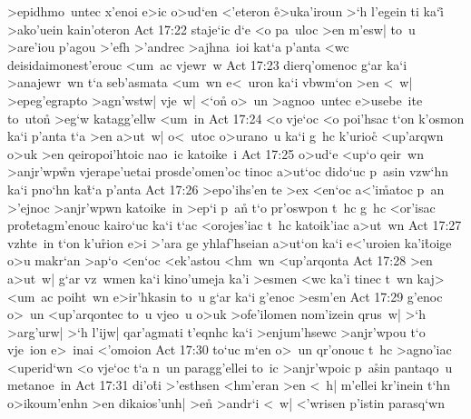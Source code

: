 >epidhmo~untec
x'enoi
e>ic
o>ud`en
<'eteron
\r{e}>uka'iroun
>`h
l'egein
ti
ka`i\r{}
>ako'uein
kain'oteron\bibvsend
\vs Act 17:22
staje`ic
d`e
<o
pa~uloc
>en
m'esw|
to~u
>are'iou
p'agou
>'efh
>'andrec
>ajhna~ioi
kat`a
p'anta
<wc
deisidaimonest'erouc
<um~ac
vjewr~w\bibvsend
\vs Act 17:23
dierq'omenoc
g`ar
ka`i
>anajewr~wn
t`a
seb'asmata
<um~wn
e<~uron
ka`i
vbwm`on
>en
<~w|
>epeg'egrapto
>agn'wstw|
vje~w|
<`o\r{n}
o>~un
>agnoo~untec
e>usebe~ite
to~uto\r{n}
>eg`w
katagg'ellw
<um~in\bibvsend
\vs Act 17:24
<o
vje`oc
<o
poi'hsac
t`on
k'osmon
ka`i
p'anta
t`a
>en
a>ut~w|
o<~utoc
o>urano~u
ka`i
g~hc
k'urioc\r{}
<up'arqwn
o>uk
>en
qeiropoi'htoic
nao~ic
katoike~i\bibvsend
\vs Act 17:25
o>ud`e
<up`o
qeir~wn
>anjr'wp\r{w}n
vjerape'uetai
prosde'omen'oc
tinoc
a>ut`oc
dido`uc
p~asin
vzw`hn
ka`i
pno`hn
ka\r{t}`a
p'anta\bibvsend
\vs Act 17:26
>epo'ihs'en
te
>ex
<en`oc
a<'i\r{m}atoc
p~an
>'ejnoc
>anjr'wpwn
katoike~in
>ep`i
p~an\r{}
t`o
pr'oswpon
t~hc
g~hc
<or'isac
pro\r{t}etagm'enouc
kairo`uc
ka`i
t`ac
<orojes'iac
t~hc
katoik'iac
a>ut~wn\bibvsend
\vs Act 17:27
vzhte~in
t`on
k'u\r{r}ion
e>i
>'ara
ge
yhlaf'hseian
a>ut`on
ka`i
e<'uroien
ka'i\r{t}oige
o>u
makr`an
>ap`o
<en`oc
<ek'astou
<hm~wn
<up'arqonta\bibvsend
\vs Act 17:28
>en
a>ut~w|
g`ar
vz~wmen
ka`i
kino'umeja
ka'i
>esmen
<wc
ka'i
tinec
t~wn
kaj>
<um~ac
poiht~wn
e>ir'hkasin
to~u
g`ar
ka`i
g'enoc
>esm'en\bibvsend
\vs Act 17:29
g'enoc
o>~un
<up'arqontec
to~u
vjeo~u
o>uk
>ofe'ilomen
nom'izein
qrus~w|
>`h
>arg'urw|
>`h
l'ijw|
qar'agmati
t'eqnhc
ka`i
>enjum'hsewc
>anjr'wpou
t`o
vje~ion
e>~inai
<'omoion\bibvsend
\vs Act 17:30
to`uc
m`en
o>~un
qr'onouc
t~hc
>agno'iac
<uperid`wn
<o
vje`oc
t`a
n~un
paragg'ellei
to~ic
>anjr'wpoic
p~a\r{s}in
pantaqo~u
metanoe~in\bibvsend
\vs Act 17:31
di'o\r{t}i
>'esthsen
<hm'eran
>en
<~h|
m'ellei
kr'inein
t`hn
o>ikoum'enhn
>en
dikaios'unh|
>en\r{}
>andr`i
<~w|
<'wrisen
p'istin
parasq`wn
